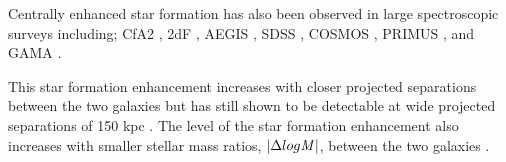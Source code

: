 \documentclass[iop,revtex4,twocolumn,apj,numberedappendix,appendixfloats]{emulateapj}
\begin{document}
Centrally enhanced star formation has also been observed in large spectroscopic surveys including; CfA2  \citep{Barton:2000, Woods:2006}, 2dF \citep{Lambas:2003}, AEGIS \citep{Lin:2007}, SDSS \citep{Ellison:2008}, COSMOS \citep{Kartaltepe:2007,Xu:2012}, PRIMUS \citep{Wong:2011}, and GAMA \citep{Robotham:2014}.

This star formation enhancement increases with closer projected separations between the two galaxies \citep{Ellison:2008, Scudder:2012} but has still shown to be detectable at wide projected separations of 150 kpc \citep{Patton:2013}. The level of the star formation enhancement also increases with smaller stellar mass ratios, $|\Delta log {\it M} |$, between the two galaxies \citep{Ellison:2008}. \\


\end{document}
